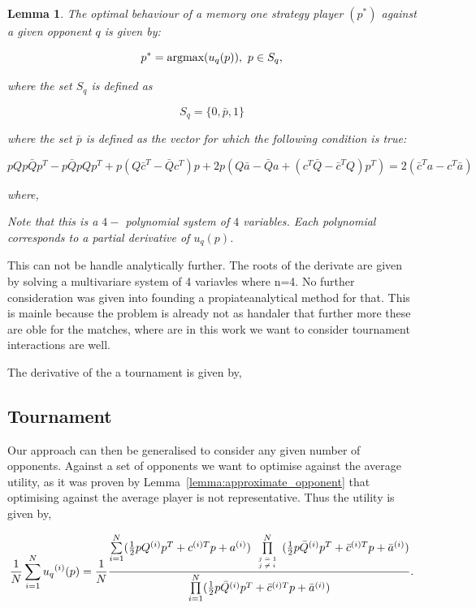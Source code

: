 \documentclass[10pt]{article}
\newtheorem{lemma}[theorem]{Lemma}
\begin{document}
\begin{lemma}\label{lemma:memone_best_response}
    The optimal behaviour of a memory one strategy player \((p^*)\) against a
    given opponent \(q\) is given by:
    
    \[p^* = \textnormal{argmax}(u_q(p)), \ p \in S_q,\]
    
    where the set \(S_q\) is defined as 
    
    \[S_q = \{0, \bar{p}, 1 \} \]
    
    where the set \(\bar{p}\) is defined as the vector for which the following condition is true:
    
    {\small
    \begin{equation*}
        pQp\bar{Q}p^T - p\bar{Q}pQp^T + p(Q\bar{c}^T - \bar{Q}c^T)p + 2p(Q\bar{a} - 
        \bar{Q}a + (c^T\bar{Q} - \bar{c}^TQ)p^T) = 2 (\bar{c}^Ta - c^T\bar{a})
    \end{equation*}}
    
    where,

    Note that this is a \(4-\) polynomial system of \(4\) variables. Each polynomial
    corresponds to a partial derivative of \(u_q(p)\).
\end{lemma}

This can not be handle analytically further. The roots of the derivate are given
by solving a multivariare system of 4 variavles where n=4. No further consideration
was given into founding  a propiateanalytical method for that. This is mainle because
the problem is already not as handaler that further more these are oble for the
matches, where are in this work we want to consider tournament interactions are well.

The derivative of the a tournament is given by,

\subsection{Tournament}
Our approach can then be generalised to consider any given number of opponents. Against
a set of opponents we want to optimise against the average utility, as it was
proven by Lemma~\ref{lemma:approximate_opponent} that optimising against the average
player is not representative. Thus the utility is given by,

\begin{equation}\label{eq:tournament_utility}
    \frac{1}{N} \sum\limits_{i=1} ^ {N} {u_q}^{(i)} (p) = \frac{1}{N}
    \frac{\sum\limits_{i=1} ^ {N} (\frac{1}{2} pQ^{(i)} p^T + c^{(i)T} p + a^ {(i)})
    \prod\limits_{\tiny\begin{array}{l} j=1 \\ j \neq i \end{array}} ^ 
    N (\frac{1}{2} p\bar{Q}^{(i)} p^T + \bar{c}^{(i)T} p + \bar{a}^ {(i)})}
    {\prod\limits_{i=1} ^ N (\frac{1}{2} p\bar{Q}^{(i)} p^T + \bar{c}^{(i)T} p + \bar{a}^ {(i)})}.
\end{equation}
\end{document}
